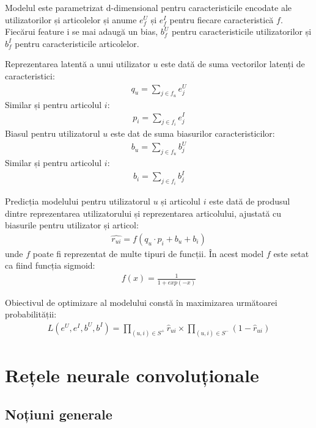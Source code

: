 Modelul este parametrizat d-dimensional pentru caracteristicile encodate ale utilizatorilor și articolelor și anume $e_f^U$ și $e_f^I$ pentru fiecare caracteristică $f$. Fiecărui feature i se mai adaugă un bias, $b_f^U$ pentru caracteristicile utilizatorilor și $b_f^I$ pentru caracteristicile articolelor.

Reprezentarea latentă a unui utilizator $u$ este dată de suma vectorilor latenți de caracteristici:
\begin{align}
	q_u = \sum_{j \in f_u} e_j^U
\end{align}
Similar și pentru articolul $i$:
\begin{align}
	p_i = \sum_{j \in f_i} e_j^I
\end{align}
Biasul pentru utilizatorul $u$ este dat de suma biasurilor caracteristicilor:
\begin{align}
	b_u = \sum_{j \in f_u} b_j^U
\end{align}
Similar și pentru articolul $i$:
\begin{align}
	b_i = \sum_{j \in f_i} b_j^I
\end{align}

Predicția modelului pentru utilizatorul $u$ și articolul $i$ este dată de produsul dintre reprezentarea utilizatorului și reprezentarea articolului, ajustată cu biasurile pentru utilizator și articol:
\begin{align}
	\hat{r_{ui}} = f(q_u \cdot p_i + b_u + b_i)
\end{align}
unde $f$ poate fi reprezentat de multe tipuri de funcții. În acest model $f$ este setat ca fiind funcția sigmoid:
\begin{align}
	f(x) = \frac{1}{1 + exp(-x)}
\end{align}

Obiectivul de optimizare al modelului constă în maximizarea următoarei probabilității:
\begin{align}
	L(e^U, e^I, b^U, b^I) = \prod_{(u,i) \in S^+} \hat{r}_{ui} \times \prod_{(u,i) \in S^-} (1 -\hat{r}_{ui})
\end{align}

\section{Rețele neurale convoluționale}

\subsection{Noțiuni generale}

